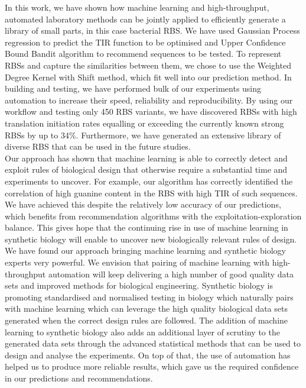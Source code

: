 \documentclass{article}
\begin{document}
In this work, we have shown how machine learning and high-throughput, automated laboratory methods can be jointly applied to efficiently generate a library of small parts, in this case bacterial RBS. 
We have used Gaussian Process regression to predict the TIR function to be optimised and Upper Confidence Bound Bandit algorithm to recommend sequences to be tested.
To represent RBSs and capture the similarities between them, we chose to use the
Weighted Degree Kernel with Shift method, which fit well into our prediction method.
In building and testing, we have performed bulk of our experiments using automation to increase their speed, reliability and reproducibility.
By using our workflow and testing only 450 RBS variants, we have discovered 
RBSs with high translation initiation rates equalling or exceeding the currently known strong RBSs by up to 34\%.
Furthermore, we have generated an extensive library of diverse RBS that can be used in the future studies.\\

Our approach has shown that machine learning is able to correctly detect and exploit rules of biological design that otherwise require a substantial time and experiments to uncover.
For example, our algorithm has correctly identified the correlation of high guanine content in the RBS with high TIR of such sequences.
We have achieved this despite the relatively low accuracy of our predictions, which benefits from recommendation algorithms with the exploitation-exploration balance.
This gives hope that the continuing rise in use of machine learning in synthetic biology will enable to uncover new biologically relevant rules of design.\\

We have found our approach bringing machine learning and synthetic biology experts very powerful.
We envision that pairing of machine learning with high-throughput automation will keep delivering a high number of good quality data sets and improved methods for biological engineering.
Synthetic biology is promoting standardised and normalised testing in biology which naturally pairs with machine learning which can leverage the high quality biological data sets generated when the correct design rules are followed.
The addition of machine learning to synthetic biology also adds an additional layer of scrutiny to the generated data sets through the advanced statistical methods that can be used to design and analyse the experiments.
On top of that, the use of automation has helped us to produce more reliable results, which gave us the required confidence in our predictions and recommendations.\\
\end{document}
